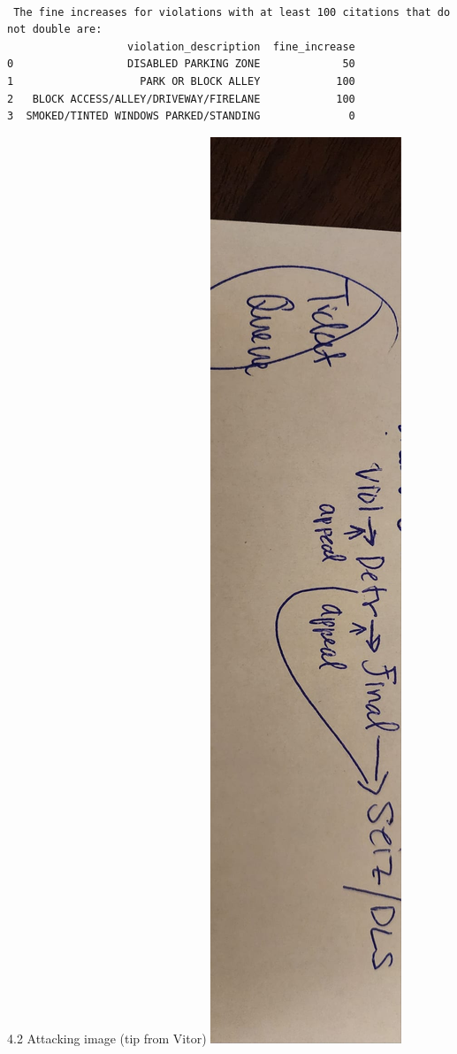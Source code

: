 \documentclass[
  letterpaper,
  DIV=11,
  numbers=noendperiod]{scrartcl}
\begin{document}
\begin{verbatim}

 The fine increases for violations with at least 100 citations that do not double are:
                   violation_description  fine_increase
0                  DISABLED PARKING ZONE             50
1                    PARK OR BLOCK ALLEY            100
2   BLOCK ACCESS/ALLEY/DRIVEWAY/FIRELANE            100
3  SMOKED/TINTED WINDOWS PARKED/STANDING              0
\end{verbatim}

4.2 Attacking image (tip from Vitor) \includegraphics{ticket.jpg}
\end{document}
